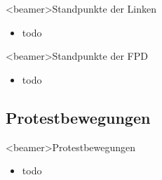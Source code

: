     \begin{frame}<beamer>{Standpunkte der Linken}
       \begin{itemize}
        \item todo
  
      \end{itemize}
    \end{frame}

    \begin{frame}<beamer>{Standpunkte der FPD}
       \begin{itemize}
        \item todo
  
      \end{itemize}
    \end{frame}
      \subsection{Protestbewegungen}
    \begin{frame}<beamer>{Protestbewegungen}
       \begin{itemize}
        \item todo
  
      \end{itemize}
    \end{frame}


